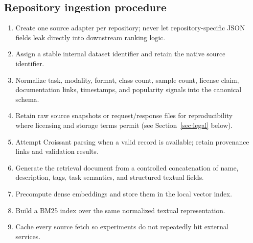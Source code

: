 \documentclass[11pt]{article}
\begin{document}
\subsection{Repository ingestion procedure}
\begin{enumerate}[leftmargin=*]
\item Create one source adapter per repository; never let repository-specific JSON fields leak directly
      into downstream ranking logic.
\item Assign a stable internal dataset identifier and retain the native source identifier.
\item Normalize task, modality, format, class count, sample count, license claim, documentation links,
      timestamps, and popularity signals into the canonical schema.
\item Retain raw source snapshots or request/response files for reproducibility where licensing and
      storage terms permit (see Section~\ref{sec:legal} below).
\item Attempt Croissant parsing when a valid record is available; retain provenance links and validation
      results.
\item Generate the retrieval document from a controlled concatenation of name, description, tags, task
      semantics, and structured textual fields.
\item Precompute dense embeddings and store them in the local vector index.
\item Build a BM25 index over the same normalized textual representation.
\item Cache every source fetch so experiments do not repeatedly hit external services.
\end{enumerate}
\end{document}
